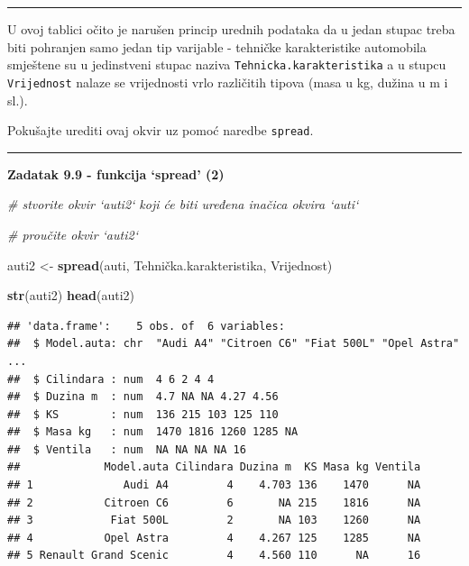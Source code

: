 \documentclass[]{book}
\newenvironment{Shaded}{\begin{snugshade}}{\end{snugshade}}
\newcommand{\KeywordTok}[1]{\textcolor[rgb]{0.13,0.29,0.53}{\textbf{#1}}}
\newcommand{\StringTok}[1]{\textcolor[rgb]{0.31,0.60,0.02}{#1}}
\newcommand{\CommentTok}[1]{\textcolor[rgb]{0.56,0.35,0.01}{\textit{#1}}}
\newcommand{\NormalTok}[1]{#1}
\theoremstyle{definition}
\theoremstyle{definition}
\theoremstyle{definition}
\theoremstyle{remark}
\begin{document}
\begin{center}\rule{0.5\linewidth}{\linethickness}\end{center}

U ovoj tablici očito je narušen princip urednih podataka da u jedan
stupac treba biti pohranjen samo jedan tip varijable - tehničke
karakteristike automobila smještene su u jedinstveni stupac naziva
\texttt{Tehnicka.karakteristika} a u stupcu \texttt{Vrijednost} nalaze
se vrijednosti vrlo različitih tipova (masa u kg, dužina u m i sl.).

Pokušajte urediti ovaj okvir uz pomoć naredbe \texttt{spread}.

\begin{center}\rule{0.5\linewidth}{\linethickness}\end{center}

\textbf{Zadatak 9.9 - funkcija `spread' (2)}

\begin{Shaded}
\begin{Highlighting}[]
\CommentTok{# stvorite okvir `auti2` koji će biti uređena inačica okvira `auti`}

\CommentTok{# proučite okvir `auti2`}
\end{Highlighting}
\end{Shaded}

\begin{Shaded}
\begin{Highlighting}[]
\NormalTok{auti2 <-}\StringTok{ }\KeywordTok{spread}\NormalTok{(auti, Tehnička.karakteristika, Vrijednost)}

\KeywordTok{str}\NormalTok{(auti2)}
\KeywordTok{head}\NormalTok{(auti2)}
\end{Highlighting}
\end{Shaded}

\begin{verbatim}
## 'data.frame':    5 obs. of  6 variables:
##  $ Model.auta: chr  "Audi A4" "Citroen C6" "Fiat 500L" "Opel Astra" ...
##  $ Cilindara : num  4 6 2 4 4
##  $ Duzina m  : num  4.7 NA NA 4.27 4.56
##  $ KS        : num  136 215 103 125 110
##  $ Masa kg   : num  1470 1816 1260 1285 NA
##  $ Ventila   : num  NA NA NA NA 16
##             Model.auta Cilindara Duzina m  KS Masa kg Ventila
## 1              Audi A4         4    4.703 136    1470      NA
## 2           Citroen C6         6       NA 215    1816      NA
## 3            Fiat 500L         2       NA 103    1260      NA
## 4           Opel Astra         4    4.267 125    1285      NA
## 5 Renault Grand Scenic         4    4.560 110      NA      16
\end{verbatim}
\end{document}
